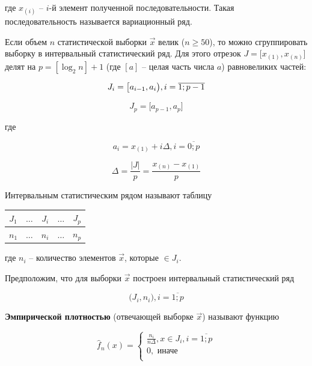 где $x_{(i)}$ -- $i$-й элемент полученной последовательности. Такая последовательность называется вариационный ряд.

Если объем $n$ статистической выборки $\vec x$ велик ($n \geq 50$), то можно сгруппировать выборку в интервальный статистический ряд. Для этого отрезок $J = \big[ x_{(1)}, x_{(n)} \big]$ делят на $p = [\log_2n] + 1$ (где $[a]$ -- целая часть числа $a$) равновеликих частей:

\begin{equation*}
    J_i = \big[ a_{i-1}, a_i \big), i = \overline{1; p-1} \\
\end{equation*}

\begin{equation*}
    J_{p} = \big[ a_{p-1}, a_p \big]
\end{equation*}

где

\begin{equation*}
    a_i = x_{(1)} + i\Delta, i = \overline{0;p}
\end{equation*}

\begin{equation*}
    \Delta = \frac{|J|}{p} = \frac{x_{(n)} - x_{(1)}}{p}
\end{equation*}

Интервальным статистическим рядом называют таблицу

\begin{table}[H]
    \centering
    \begin{tabular}{|c|c|c|c|c|}
        \hline
        $J_1$ & $\dots$ & $J_i$ & $\dots$ & $J_p$ \\
        \hline
        $n_1$ & $\dots$ & $n_i$ & $\dots$ & $n_p$ \\
        \hline
    \end{tabular}
\end{table}

где $n_i$ -- количество элементов $\vec x$, которые $\in J_i$.

Предположим, что для выборки $\vec x$ построен интервальный статистический
ряд

\begin{equation*}
    \big( J_i, n_i \big), i = \overline{1; p}
\end{equation*}

\textbf{Эмпирической плотностью}
(отвечающей выборке $\vec x$) называют функцию

\begin{equation*}
    \hat f_n(x) =
    \begin{cases}
        \frac{n_i}{n \Delta}, x \in J_i, i = \overline{1; p} \\
        0, \text{ иначе} \\
    \end{cases}
\end{equation*}


